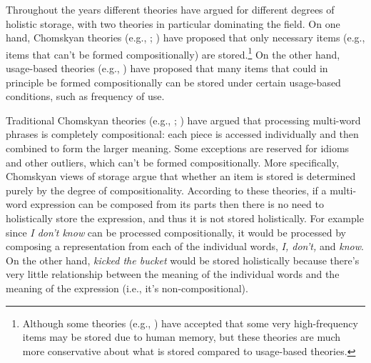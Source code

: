 \documentclass[
  12pt,
  letterpaper,
]{scrreprt}
\begin{document}
Throughout the years different theories have argued for different
degrees of holistic storage, with two theories in particular dominating
the field. On one hand, Chomskyan theories (e.g.,
;
) have proposed that
only necessary items (e.g., items that can't be formed compositionally)
are stored.\footnote{Although some theories (e.g.,
  ) have accepted that
  some very high-frequency items may be stored due to human memory, but
  these theories are much more conservative about what is stored
  compared to usage-based theories.} On the other hand, usage-based
theories (e.g., ) have proposed
that many items that could in principle be formed compositionally can be
stored under certain usage-based conditions, such as frequency of use.

Traditional Chomskyan theories (e.g.,
;
) have argued that
processing multi-word phrases is completely compositional: each piece is
accessed individually and then combined to form the larger meaning. Some
exceptions are reserved for idioms and other outliers, which can't be
formed compositionally. More specifically, Chomskyan views of storage
argue that whether an item is stored is determined purely by the degree
of compositionality. According to these theories, if a multi-word
expression can be composed from its parts then there is no need to
holistically store the expression, and thus it is not stored
holistically. For example since \emph{I don't know} can be processed
compositionally, it would be processed by composing a representation
from each of the individual words, \emph{I, don't,} and \emph{know}. On
the other hand, \emph{kicked the bucket} would be stored holistically
because there's very little relationship between the meaning of the
individual words and the meaning of the expression (i.e., it's
non-compositional).
\end{document}
